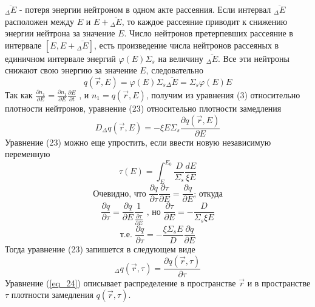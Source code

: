 \documentclass[a4paper]{article}
\begin{document}
    \newline
    $\overline{{}_\Delta E}$ - потеря энергии нейтроном в одном акте
    рассеяния. Если интервал $\overline{{}_\Delta E}$ расположен
    между $E$ и $E + \overline{{}_\Delta E}$, то каждое рассеяние
    приводит к снижению энергии нейтрона за значение $E$.
    \newline
    Число нейтронов претерпевших рассеяние в интервале
    $[E, E + \overline{{}_\Delta E}]$, есть произведение числа
    нейтронов рассеяных в единичном интервале энергий
    $\varphi(E)\Sigma_s$ на величину
    $\overline{{}_\Delta E}$. Все эти нейтроны снижают свою энергию
    за значение $E$, следовательно
    \begin{equation}
        q(\overrightarrow{r},E) =
        \varphi(E)\Sigma_s\overline{{}_\Delta E} =
        \Sigma_s\varphi(E)E
    \end{equation}
    \newline
    Так как \(\frac{\partial n_1}{\partial E} =
    \frac{\partial n_1}{\partial E} \frac{\partial E}{\partial t}\)
    , и \(n_1 = q(\overrightarrow{r},E)\), получим из уравнения (3)
    относительно плотности нейтронов, уравнение (23) относительно
    плотности замедления
    \begin{equation}
        D_\Delta q(\overrightarrow{r}, E) = -\xi E\Sigma_s
        \frac{\partial q(\overrightarrow{r}, E)}{\partial E}
    \end{equation}
    Уравнение (23) можно еще упростить, если ввести новую независимую
    переменную
    \begin{equation}
        \tau(E) = \int_E^{E_0} \frac{D}{\Sigma_s}\frac{dE}{\xi E}
    \end{equation}
    \begin{equation}
        \text{Очевидно, что }
        \frac{\partial q}{\partial \tau}
        \frac{\partial \tau}{\partial E} =
        \frac{\partial q}{\partial E}
        \text{; откуда}
    \end{equation}
    \begin{equation}
        \frac{\partial q}{\partial \tau} =
        \frac{\partial q}{\partial E}
        \frac{1}{\frac{\partial \tau}{\partial E}}
        \text{ , но }
        \frac{\partial \tau}{\partial E} =
        -\frac{D}{\Sigma_s\xi E}
    \end{equation}
    \begin{equation}
        \text{т.е. }
        \frac{\partial q}{\partial \tau} =
        -\frac{\xi\Sigma_s E}{D}\frac{\partial q}{\partial E}
    \end{equation}
    Тогда уравнение (23) запишется в следующем виде
    \begin{equation}\label{eq_24}\tag{24}
        {}_\Delta q(\overrightarrow{r}, \tau) =
        \frac{\partial q(\overrightarrow{r}, \tau)}{\partial \tau}
    \end{equation}
    Уравнение (\ref{eq_24}) описывает распределение в пространстве
    $\overrightarrow{r}$ и в пространстве $\tau$ плотности
    замедления $q(\overrightarrow{r}, \tau)$.
\end{document}
